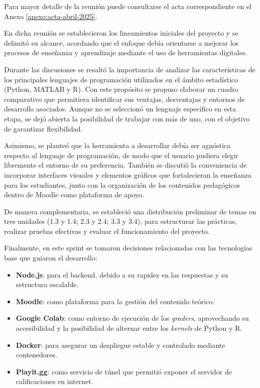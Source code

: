 \documentclass[letter,oneside,12pt,spanish]{report}
\begin{document}
\noindent Para mayor detalle de la reunión puede consultarse el acta correspondiente en el Anexo \ref{anexo:acta-abril-2025}.

En dicha reunión se establecieron los lineamientos iniciales del proyecto y se delimitó su alcance, acordando que el enfoque debía orientarse a mejorar los procesos de enseñanza y aprendizaje mediante el uso de herramientas digitales.  

Durante las discusiones se resaltó la importancia de analizar las características de los principales lenguajes de programación utilizados en el ámbito estadístico (Python, MATLAB y R). Con este propósito se propuso elaborar un cuadro comparativo que permitiera identificar sus ventajas, desventajas y entornos de desarrollo asociados. Aunque no se seleccionó un lenguaje específico en esta etapa, se dejó abierta la posibilidad de trabajar con más de uno, con el objetivo de garantizar flexibilidad.  

Asimismo, se planteó que la herramienta a desarrollar debía ser agnóstica respecto al lenguaje de programación, de modo que el usuario pudiera elegir libremente el entorno de su preferencia. También se discutió la conveniencia de incorporar interfaces visuales y elementos gráficos que fortalecieran la enseñanza para los estudiantes, junto con la organización de los contenidos pedagógicos dentro de Moodle como plataforma de apoyo.  

De manera complementaria, se estableció una distribución preliminar de temas en tres unidades (1.3 y 1.4; 2.3 y 2.4; 3.3 y 3.4), para estructurar las prácticas, realizar pruebas efectivas y evaluar el funcionamiento del proyecto.  

Finalmente, en este sprint se tomaron decisiones relacionadas con las tecnologías base que guiaron el desarrollo:  

\begin{itemize}
	\item \textbf{Node.js}: para el backend, debido a su rapidez en las respuestas y su estructura escalable.  
	\item \textbf{Moodle}: como plataforma para la gestión del contenido teórico.  
	\item \textbf{Google Colab}: como entorno de ejecución de los \textit{graders}, aprovechando su accesibilidad y la posibilidad de alternar entre los \textit{kernels} de Python y R.  
	\item \textbf{Docker}: para asegurar un despliegue estable y controlado mediante contenedores.  
	\item \textbf{Playit.gg}: como servicio de túnel que permitió exponer el servidor de calificaciones en internet.  
\end{itemize}
\end{document}
